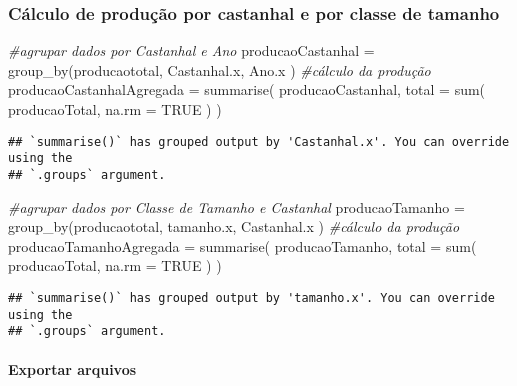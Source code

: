 \documentclass[
]{article}
\newenvironment{Shaded}{\begin{snugshade}}{\end{snugshade}}
\newcommand{\AttributeTok}[1]{\textcolor[rgb]{0.77,0.63,0.00}{#1}}
\newcommand{\CommentTok}[1]{\textcolor[rgb]{0.56,0.35,0.01}{\textit{#1}}}
\newcommand{\ConstantTok}[1]{\textcolor[rgb]{0.00,0.00,0.00}{#1}}
\newcommand{\FunctionTok}[1]{\textcolor[rgb]{0.00,0.00,0.00}{#1}}
\newcommand{\NormalTok}[1]{#1}
\newcommand{\OtherTok}[1]{\textcolor[rgb]{0.56,0.35,0.01}{#1}}
\begin{document}
\hypertarget{cuxe1lculo-de-produuxe7uxe3o-por-castanhal-e-por-classe-de-tamanho}{%
\subsubsection{Cálculo de produção por castanhal e por classe de
tamanho}\label{cuxe1lculo-de-produuxe7uxe3o-por-castanhal-e-por-classe-de-tamanho}}

\begin{Shaded}
\begin{Highlighting}[]
\CommentTok{\#agrupar dados por Castanhal e Ano}
\NormalTok{producaoCastanhal }\OtherTok{=} \FunctionTok{group\_by}\NormalTok{(producaototal, Castanhal.x, Ano.x )}
\CommentTok{\#cálculo da produção}
\NormalTok{producaoCastanhalAgregada }\OtherTok{=} \FunctionTok{summarise}\NormalTok{(}
\NormalTok{    producaoCastanhal,}
    \AttributeTok{total =} \FunctionTok{sum}\NormalTok{(}
\NormalTok{        producaoTotal,}
        \AttributeTok{na.rm =} \ConstantTok{TRUE}
\NormalTok{    )}
\NormalTok{)}
\end{Highlighting}
\end{Shaded}

\begin{verbatim}
## `summarise()` has grouped output by 'Castanhal.x'. You can override using the
## `.groups` argument.
\end{verbatim}

\begin{Shaded}
\begin{Highlighting}[]
\CommentTok{\#agrupar dados por Classe de Tamanho e Castanhal}
\NormalTok{producaoTamanho }\OtherTok{=} \FunctionTok{group\_by}\NormalTok{(producaototal, tamanho.x, Castanhal.x )}
\CommentTok{\#cálculo da produção}
\NormalTok{producaoTamanhoAgregada }\OtherTok{=} \FunctionTok{summarise}\NormalTok{(}
\NormalTok{    producaoTamanho,}
    \AttributeTok{total =} \FunctionTok{sum}\NormalTok{(}
\NormalTok{        producaoTotal,}
        \AttributeTok{na.rm =} \ConstantTok{TRUE}
\NormalTok{    )}
\NormalTok{)}
\end{Highlighting}
\end{Shaded}

\begin{verbatim}
## `summarise()` has grouped output by 'tamanho.x'. You can override using the
## `.groups` argument.
\end{verbatim}

\hypertarget{exportar-arquivos}{%
\paragraph{Exportar arquivos}\label{exportar-arquivos}}
\end{document}
